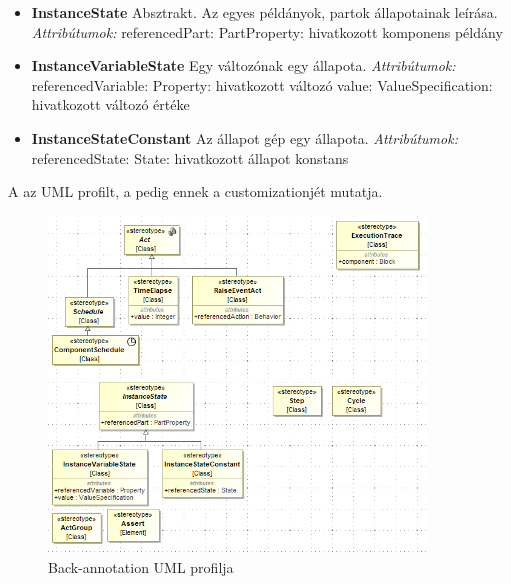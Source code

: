 \begin{itemize}
	\item \textbf{InstanceState} \newline
	Absztrakt. Az egyes példányok, partok állapotainak leírása.
	\newline
	\textit{Attribútumok:}
	\subitem referencedPart: PartProperty: hivatkozott komponens példány
	
	\item \textbf{InstanceVariableState} \newline
	Egy változónak egy állapota.
	\newline
	\textit{Attribútumok:}
	\subitem referencedVariable: Property: hivatkozott változó
	\subitem value: ValueSpecification: hivatkozott változó értéke
	
	\item \textbf{InstanceStateConstant} \newline
	Az állapot gép egy állapota.
	\newline
	\textit{Attribútumok:}
	\subitem referencedState: State: hivatkozott állapot konstans
\end{itemize}

A  az UML profilt, a  pedig ennek a customizationjét mutatja.

\begin{figure}[!ht]
	\centering
	\includegraphics[width=100mm, keepaspectratio]{figures/contribution/trace-model.png}
	\caption{Back-annotation UML profilja}
	\label{fig:contribution-trace-profile}
\end{figure}

